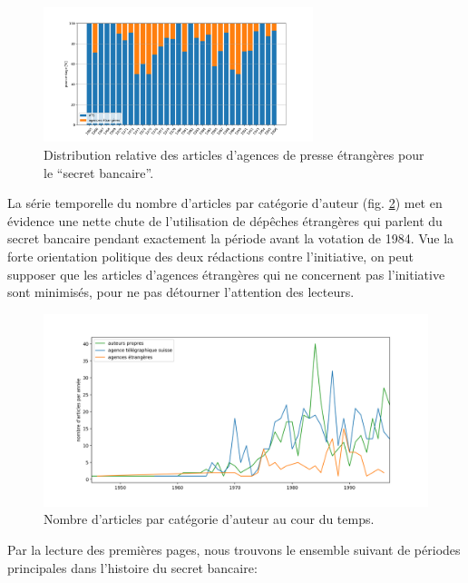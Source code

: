 \documentclass[11pt]{article}
\begin{document}
\begin{figure}
\centering
\includegraphics[width=0.7\textwidth ]{analysis/agency_percentage.png}
\caption{\label{percentage1} Distribution relative des articles
d'agences de presse étrangères pour le ``secret bancaire''.}
\end{figure}

La série temporelle du nombre d'articles par catégorie d'auteur (fig.
\ref{categorie}) met en évidence une nette chute de l'utilisation de
dépêches étrangères qui parlent du secret bancaire pendant exactement la
période avant la votation de 1984. Vue la forte orientation politique
des deux rédactions contre l'initiative, on peut supposer que les
articles d'agences étrangères qui ne concernent pas l'initiative sont
minimisés, pour ne pas détourner l'attention des lecteurs.

\begin{figure}
\centering
\includegraphics[width=1\textwidth ]{analysis/authors_agency_count.png}
\caption{\label{categorie} Nombre d'articles par catégorie d'auteur au
cour du temps.}
\end{figure}

Par la lecture des premières pages, nous trouvons le ensemble suivant de
périodes principales dans l'histoire du secret bancaire:
\end{document}
